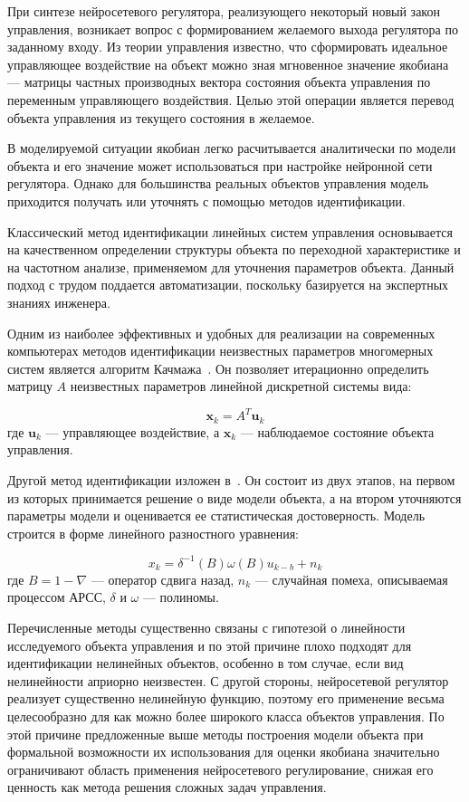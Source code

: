 При синтезе нейросетевого регулятора, реализующего некоторый новый
закон управления, возникает вопрос с формированием желаемого выхода
регулятора по заданному входу.  Из теории управления известно, что
сформировать идеальное управляющее воздействие на объект можно зная
мгновенное значение якобиана --- матрицы частных производных вектора
состояния объекта управления по переменным управляющего воздействия.
Целью этой операции является перевод объекта управления из текущего
состояния в желаемое.

В моделируемой ситуации якобиан легко расчитывается аналитически по
модели объекта и его значение может использоваться при настройке
нейронной сети регулятора.  Однако для большинства реальных объектов
управления модель приходится получать или уточнять с помощью методов
идентификации.

Классический метод идентификации линейных систем управления
основывается на качественном определении структуры объекта по
переходной характеристике и на частотном анализе, применяемом для
уточнения параметров объекта.  Данный подход с трудом поддается
автоматизации, поскольку базируется на экспертных знаниях инженера.

Одним из наиболее эффективных и удобных для реализации на современных
компьютерах методов идентификации неизвестных параметров многомерных
систем является алгоритм Качмажа~\cite{bolonchin91}.  Он позволяет
итерационно определить матрицу $A$ неизвестных параметров линейной
дискретной системы вида:

\begin{equation}\label{kachmaj}
\mathbf{x}_k=A^T \mathbf{u}_k
\end{equation} где $\mathbf{u}_k$ --- управляющее воздействие, а
$\mathbf{x}_k$ --- наблюдаемое состояние объекта управления.

Другой метод идентификации изложен в~\cite{boxjenk74}.  Он состоит из
двух этапов, на первом из которых принимается решение о виде модели
объекта, а на втором уточняются параметры модели и оценивается ее
статистическая достоверность.  Модель строится в форме линейного
разностного уравнения:

\begin{equation}\label{arima}
x_k=\delta^{-1}(B)\omega(B) u_{k-b} + n_k
\end{equation} где $B=1-\nabla$ --- оператор сдвига назад, $n_k$ ---
случайная помеха, описываемая процессом АРСС, $\delta$ и $\omega$ ---
полиномы.

Перечисленные методы существенно связаны с гипотезой о линейности
исследуемого объекта управления и по этой причине плохо подходят для
идентификации нелинейных объектов, особенно в том случае, если вид
нелинейности априорно неизвестен.  С другой стороны, нейросетевой
регулятор реализует существенно нелинейную функцию, поэтому его
применение весьма целесообразно для как можно более широкого класса
объектов управления.  По этой причине предложенные выше методы
построения модели объекта при формальной возможности их использования
для оценки якобиана значительно ограничивают область применения
нейросетевого регулирование, снижая его ценность как метода решения
сложных задач управления.

